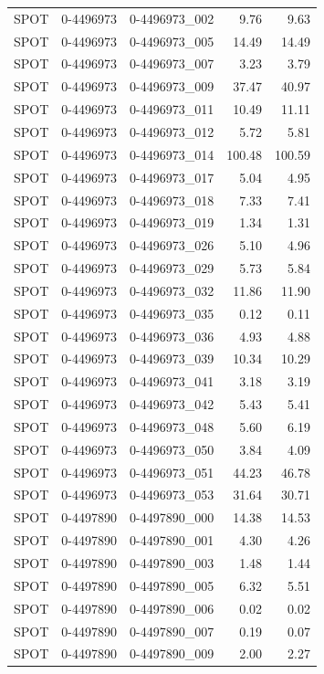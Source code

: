 \begin{tabular}{lllrr}
SPOT & 0-4496973 & 0-4496973_002 & 9.76 & 9.63 \\
SPOT & 0-4496973 & 0-4496973_005 & 14.49 & 14.49 \\
SPOT & 0-4496973 & 0-4496973_007 & 3.23 & 3.79 \\
SPOT & 0-4496973 & 0-4496973_009 & 37.47 & 40.97 \\
SPOT & 0-4496973 & 0-4496973_011 & 10.49 & 11.11 \\
SPOT & 0-4496973 & 0-4496973_012 & 5.72 & 5.81 \\
SPOT & 0-4496973 & 0-4496973_014 & 100.48 & 100.59 \\
SPOT & 0-4496973 & 0-4496973_017 & 5.04 & 4.95 \\
SPOT & 0-4496973 & 0-4496973_018 & 7.33 & 7.41 \\
SPOT & 0-4496973 & 0-4496973_019 & 1.34 & 1.31 \\
SPOT & 0-4496973 & 0-4496973_026 & 5.10 & 4.96 \\
SPOT & 0-4496973 & 0-4496973_029 & 5.73 & 5.84 \\
SPOT & 0-4496973 & 0-4496973_032 & 11.86 & 11.90 \\
SPOT & 0-4496973 & 0-4496973_035 & 0.12 & 0.11 \\
SPOT & 0-4496973 & 0-4496973_036 & 4.93 & 4.88 \\
SPOT & 0-4496973 & 0-4496973_039 & 10.34 & 10.29 \\
SPOT & 0-4496973 & 0-4496973_041 & 3.18 & 3.19 \\
SPOT & 0-4496973 & 0-4496973_042 & 5.43 & 5.41 \\
SPOT & 0-4496973 & 0-4496973_048 & 5.60 & 6.19 \\
SPOT & 0-4496973 & 0-4496973_050 & 3.84 & 4.09 \\
SPOT & 0-4496973 & 0-4496973_051 & 44.23 & 46.78 \\
SPOT & 0-4496973 & 0-4496973_053 & 31.64 & 30.71 \\
SPOT & 0-4497890 & 0-4497890_000 & 14.38 & 14.53 \\
SPOT & 0-4497890 & 0-4497890_001 & 4.30 & 4.26 \\
SPOT & 0-4497890 & 0-4497890_003 & 1.48 & 1.44 \\
SPOT & 0-4497890 & 0-4497890_005 & 6.32 & 5.51 \\
SPOT & 0-4497890 & 0-4497890_006 & 0.02 & 0.02 \\
SPOT & 0-4497890 & 0-4497890_007 & 0.19 & 0.07 \\
SPOT & 0-4497890 & 0-4497890_009 & 2.00 & 2.27 \\

\end{tabular}

